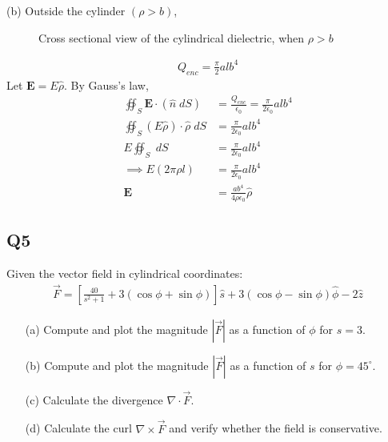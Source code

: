 \documentclass[12pt]{article}
\providecommand{\brak}[1]{\ensuremath{\left(#1\right)}}
\begin{document}
(b) Outside the cylinder \brak{\rho > b},
\begin{figure}[!ht]
\centering
{}%

\label{fig:my_label}
\caption{Cross sectional view of the cylindrical dielectric, when $\rho > b$}
\end{figure}
\begin{align*}
    Q_{enc} = \frac{\pi}{2} alb^4
\end{align*}
Let $\mathbf{E} = E\hat{\rho}$. By Gauss's law,
\begin{align*}
    \oiint_S \mathbf{E}\cdot\brak{\hat{n}\;dS} &= \frac{Q_{enc}}{\epsilon_0} = \frac{\pi}{2\epsilon_0} alb^4\\
    \oiint_S \brak{E \hat{\rho}}\cdot\hat{\rho}\;dS &= \frac{\pi}{2\epsilon_0} alb^4\\
    E \oiint_S \;dS &= \frac{\pi}{2\epsilon_0} alb^4\\
    \implies E \brak{2\pi \rho l} &= \frac{\pi}{2\epsilon_0} alb^4\\
    \mathbf{E} &=  \frac{ab^4}{4\rho\epsilon_0} \hat{\rho}
\end{align*}

\subsection*{Q5}
Given the vector field in cylindrical coordinates:
\begin{align}
\vec{F} = \left[ \frac{40}{s^2 + 1} + 3(\cos \phi + \sin \phi) \right] \hat{s} + 3(\cos \phi - \sin \phi) \hat{\phi} - 2\hat{z}
\end{align}

\begin{enumerate}
    \item[(a)] Compute and plot the magnitude $|\vec{F}|$ as a function of $\phi$ for $s = 3$.
    \item[(b)] Compute and plot the magnitude $|\vec{F}|$ as a function of $s$ for $\phi = 45^\circ$.
    \item[(c)] Calculate the divergence $\nabla \cdot \vec{F}$.
    \item[(d)] Calculate the curl $\nabla \times \vec{F}$ and verify whether the field is conservative.
\end{enumerate}
\end{document}
